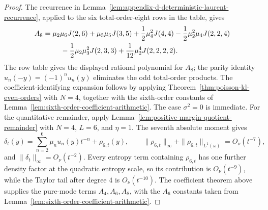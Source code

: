 \begin{proof}
The recurrence in
Lemma~\ref{lem:appendix-d-deterministic-laurent-recurrence}, applied to the
six total-order-eight rows in the table, gives
\[
\begin{aligned}
A_8&=\mu_2\mu_6J(2,6)+\mu_3\mu_5J(3,5)
+\frac12\mu_4^2J(4,4)
-\frac12\mu_2^2\mu_4J(2,2,4)\\
&\hspace{2.5em}
-\frac12\mu_2\mu_3^2J(2,3,3)
+\frac1{12}\mu_2^4J(2,2,2,2).
\end{aligned}
\]
The row table gives the displayed rational polynomial for \(A_8\); the parity
identity \(u_n(-y)=(-1)^nu_n(y)\) eliminates the odd total-order products.
The coefficient-identifying expansion follows by applying
Theorem~\ref{thm:poisson-kl-even-orders} with \(N=4\), together with the
sixth-order constants of
Lemma~\ref{lem:sixth-order-coefficient-arithmetic}.  The case
\(\sigma^2=0\) is immediate.  For the quantitative remainder, apply
Lemma~\ref{lem:positive-margin-quotient-remainder} with \(N=4\), \(L=6\),
and \(\eta=1\).  The seventh absolute moment gives
\[
\delta_t(y)=\sum_{n=2}^{6}\mu_nu_n(y)t^{-n}+\rho_{6,t}(y),
\qquad
\|\rho_{6,t}\|_\infty+\|\rho_{6,t}\|_{L^1(\omega)}=O_\nu(t^{-7}),
\]
and \(\|\delta_t\|_\infty=O_\nu(t^{-2})\).  Every entropy term containing
\(\rho_{6,t}\) has one further density factor at the quadratic entropy scale,
so its contribution is \(O_\nu(t^{-9})\), while the Taylor tail after degree
\(4\) is \(O_\nu(t^{-10})\).  The coefficient theorem above supplies the
pure-mode terms \(A_4,A_6,A_8\), with the \(A_6\) constants taken from
Lemma~\ref{lem:sixth-order-coefficient-arithmetic}.
\end{proof}
